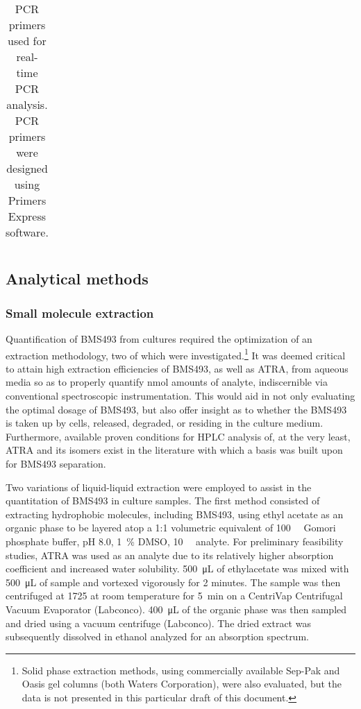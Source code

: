 \begin{refsection}
\begin{table}[h!]
\begin{tabular}{ ll }
  \hline
\end{tabular}
\caption{PCR primers used for real-time PCR analysis. PCR primers were designed
using Primers Express software.}
\label{tab:pcr_primers}
\end{table}

\subsection{Analytical methods}

\subsubsection{Small molecule extraction}
Quantification of BMS493 from cultures required the optimization of an
extraction methodology, two of which were investigated.\footnote{Solid phase
    extraction methods, using commercially available Sep-Pak  and Oasis
    gel columns (both Waters Corporation), were also evaluated, but the data is
not presented in this particular draft of this document.} It was deemed critical
to attain high extraction efficiencies of BMS493, as well as ATRA, from aqueous
media so as to properly quantify \si{\nano\mol} amounts of analyte,
indiscernible via conventional spectroscopic instrumentation. This would aid in
not only evaluating the optimal dosage of BMS493, but also offer insight as to
whether the BMS493 is taken up by cells, released, degraded, or residing in the
culture medium. Furthermore, available proven conditions for HPLC analysis of, at
the very least, ATRA and its isomers exist in the literature with which a basis
was built upon for BMS493
separation.\cite{Kim2010b,Chauveau-Duriot2010,Schaffer2010,Kane2008b,DeLeenheer1982,Motto1989} 

Two variations of liquid-liquid extraction were employed to assist in the
quantitation of BMS493 in culture samples. The first method consisted of
extracting hydrophobic molecules, including BMS493, using ethyl acetate as an
organic phase to be layered atop a 1:1 volumetric equivalent of
\SI{100}{\milli\moLar} Gomori phosphate buffer, pH 8.0, \SI{1}{\percent} DMSO,
\SI{10}{\micro\moLar} analyte. For preliminary feasibility studies, ATRA was
used as an analyte due to its relatively higher absorption coefficient and
increased water solubility. \SI{500}{\uL} of ethylacetate was mixed with
\SI{500}{\uL} of sample and vortexed vigorously for 2 minutes. The sample was
then centrifuged at \SI{1725}{\rpm} at room temperature for \SI{5}{\minute} on a
CentriVap Centrifugal Vacuum Evaporator (Labconco). \SI{400}{\uL} of the organic
phase was then sampled and dried using a vacuum centrifuge (Labconco). The dried
extract was subsequently dissolved in ethanol analyzed for an absorption
spectrum.


\end{refsection}
